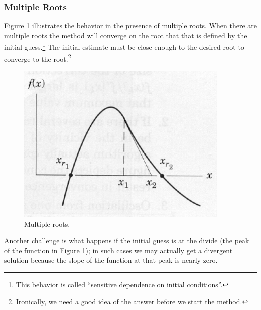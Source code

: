 \subsubsection{Multiple Roots}
Figure \ref{fig:MultipleRoots} illustrates the behavior in the presence of multiple roots.  
When there are multiple roots the method will converge on the root that that is defined by the initial guess.\footnote{This behavior is called ``sensitive dependence on initial conditions''.}  
The initial estimate must be close enough to the desired root to converge to the root.\footnote{Ironically, we need a good idea of the answer before we start the method.}
\begin{figure}[h!] %
   \centering
   \includegraphics[width=4in]{./3-Differentation/MultipleRoots.jpg} 
   \caption{Multiple roots.}
   \label{fig:MultipleRoots}
\end{figure}
Another challenge is what happens if the initial guess is at the divide (the peak of the function in Figure \ref{fig:MultipleRoots}); in such cases we may actually get a divergent solution because the slope of the function at that peak is nearly zero.  

